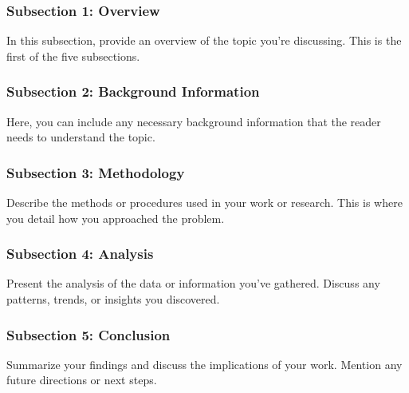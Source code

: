 \documentclass[12pt,a4paper]{article}
\begin{document}
	\subsubsection{Subsection 1: Overview}
	In this subsection, provide an overview of the topic you're discussing. This is the first of the five subsections.
	
	\subsubsection{Subsection 2: Background Information}
	Here, you can include any necessary background information that the reader needs to understand the topic.
	
	\subsubsection{Subsection 3: Methodology}
	Describe the methods or procedures used in your work or research. This is where you detail how you approached the problem.
	
	\subsubsection{Subsection 4: Analysis}
	Present the analysis of the data or information you've gathered. Discuss any patterns, trends, or insights you discovered.
	
	\subsubsection{Subsection 5: Conclusion}
	Summarize your findings and discuss the implications of your work. Mention any future directions or next steps.
    
\end{document}
